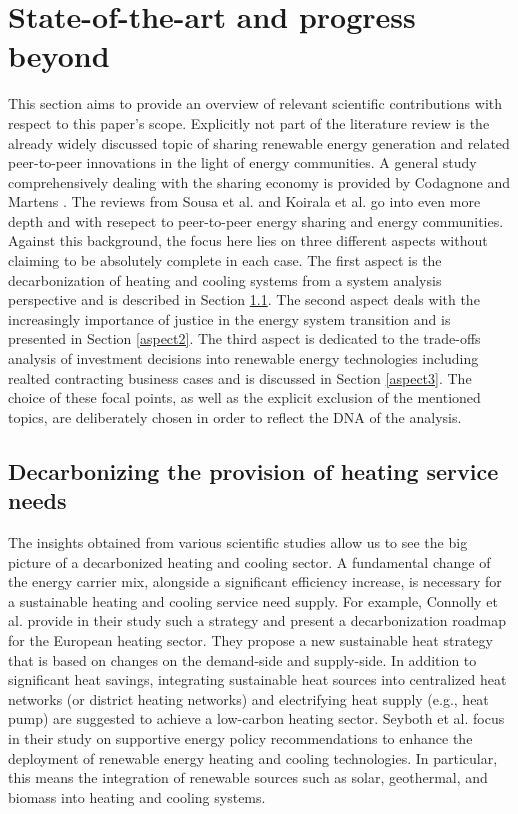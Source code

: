 \newpage
\section{State-of-the-art and progress beyond}\label{stateoftheart}
This section aims to provide an overview of relevant scientific contributions with respect to this paper's scope. Explicitly not part of the literature review is the already widely discussed topic of sharing renewable energy generation and related peer-to-peer innovations in the light of energy communities. A general study comprehensively dealing with the sharing economy is provided by Codagnone and Martens \cite{codagnone2016scoping}. The reviews from Sousa et al. \cite{sousa2019peer} and Koirala et al. \cite{koirala2016energetic} go into even more depth and with resepect to peer-to-peer energy sharing and energy communities. Against this background, the focus here lies on three different aspects without claiming to be absolutely complete in each case. The first aspect is the decarbonization of heating and cooling systems from a system analysis perspective and is described in Section \ref{aspect1}. The second aspect deals with the increasingly importance of justice in the energy system transition and is presented in Section \ref{aspect2}. The third aspect is dedicated to the trade-offs analysis of investment decisions into renewable energy technologies including realted contracting business cases and is discussed in Section \ref{aspect3}. The choice of these focal points, as well as the explicit exclusion of the mentioned topics, are deliberately chosen in order to reflect the DNA of the analysis. 

\subsection{Decarbonizing the provision of heating service needs}\label{aspect1}
The insights obtained from various scientific studies allow us to see the big picture of a decarbonized heating and cooling sector. A fundamental change of the energy carrier mix, alongside a significant efficiency increase, is necessary for a sustainable heating and cooling service need supply. For example, Connolly et al. \cite{connolly2014heat} provide in their study such a strategy and present a decarbonization roadmap for the European heating sector. They propose a new sustainable heat strategy that is based on changes on the demand-side and supply-side. In addition to significant heat savings, integrating sustainable heat sources into centralized heat networks (or district heating networks) and electrifying heat supply (e.g., heat pump) are suggested to achieve a low-carbon heating sector. Seyboth et al. \cite{seyboth2008recognising} focus in their study on supportive energy policy recommendations to enhance the deployment of renewable energy heating and cooling technologies. In particular, this means the integration of renewable sources such as solar, geothermal, and biomass into heating and cooling systems.\vspace{0.5cm}

